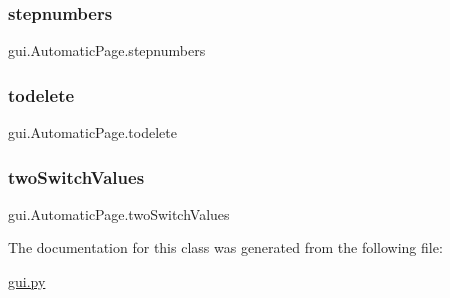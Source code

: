 \subsubsection{\texorpdfstring{stepnumbers}{stepnumbers}}
{\footnotesize\ttfamily gui.\+Automatic\+Page.\+stepnumbers}

\mbox{\label{classgui_1_1_automatic_page_a1c3c6e140390a3cb9b6f44fcd9b961ee}} 
\subsubsection{\texorpdfstring{todelete}{todelete}}
{\footnotesize\ttfamily gui.\+Automatic\+Page.\+todelete}

\mbox{\label{classgui_1_1_automatic_page_a2f2aa637bb0c955c9536b58dae6bed88}} 
\subsubsection{\texorpdfstring{twoSwitchValues}{twoSwitchValues}}
{\footnotesize\ttfamily gui.\+Automatic\+Page.\+two\+Switch\+Values}



The documentation for this class was generated from the following file\+:\begin{DoxyCompactItemize}
\item 
\mbox{\hyperlink{gui_8py}{gui.\+py}}\end{DoxyCompactItemize}
